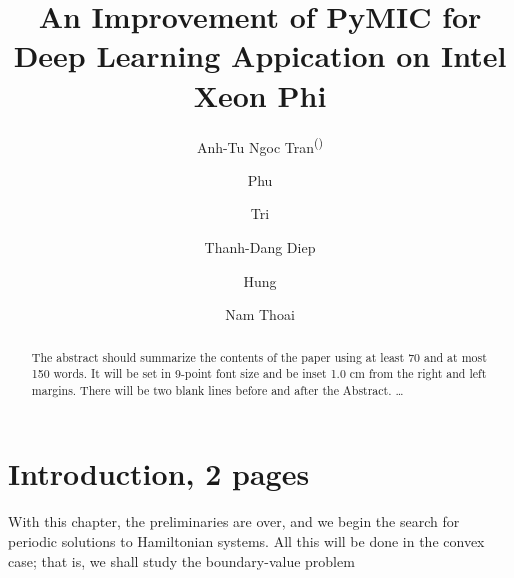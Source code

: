 \documentclass{llncs}
\begin{document}
%
\frontmatter          %
%
\pagestyle{headings}  %
%
\title{An Improvement of PyMIC for Deep Learning Appication on Intel Xeon Phi}
%
%
\author{Anh-Tu Ngoc Tran\textsuperscript{(\Letter)} \and
Phu  \and
Tri \and
Thanh-Dang Diep  \and
Hung \and
Nam Thoai
}
%
%
%

\maketitle              %

\begin{abstract}
The abstract should summarize the contents of the paper
using at least 70 and at most 150 words. It will be set in 9-point
font size and be inset 1.0 cm from the right and left margins.
There will be two blank lines before and after the Abstract. \dots


\end{abstract}
%
\section{Introduction, 2 pages}
%
With this chapter, the preliminaries are over, and we begin the search
for periodic solutions to Hamiltonian systems. All this will be done in
the convex case; that is, we shall study the boundary-value problem

\end{document}
